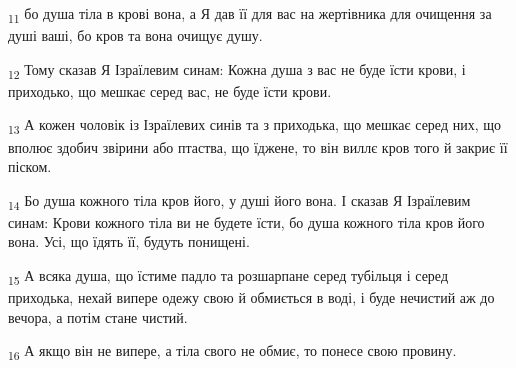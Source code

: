 \begin{tcolorbox}
\textsubscript{11} бо душа тіла в крові вона, а Я дав її для вас на жертівника для очищення за душі ваші, бо кров та вона очищує душу.
\end{tcolorbox}
\begin{tcolorbox}
\textsubscript{12} Тому сказав Я Ізраїлевим синам: Кожна душа з вас не буде їсти крови, і приходько, що мешкає серед вас, не буде їсти крови.
\end{tcolorbox}
\begin{tcolorbox}
\textsubscript{13} А кожен чоловік із Ізраїлевих синів та з приходька, що мешкає серед них, що вполює здобич звірини або птаства, що їджене, то він виллє кров того й закриє її піском.
\end{tcolorbox}
\begin{tcolorbox}
\textsubscript{14} Бо душа кожного тіла кров його, у душі його вона. І сказав Я Ізраїлевим синам: Крови кожного тіла ви не будете їсти, бо душа кожного тіла кров його вона. Усі, що їдять її, будуть понищені.
\end{tcolorbox}
\begin{tcolorbox}
\textsubscript{15} А всяка душа, що їстиме падло та розшарпане серед тубільця і серед приходька, нехай випере одежу свою й обмиється в воді, і буде нечистий аж до вечора, а потім стане чистий.
\end{tcolorbox}
\begin{tcolorbox}
\textsubscript{16} А якщо він не випере, а тіла свого не обмиє, то понесе свою провину.
\end{tcolorbox}
